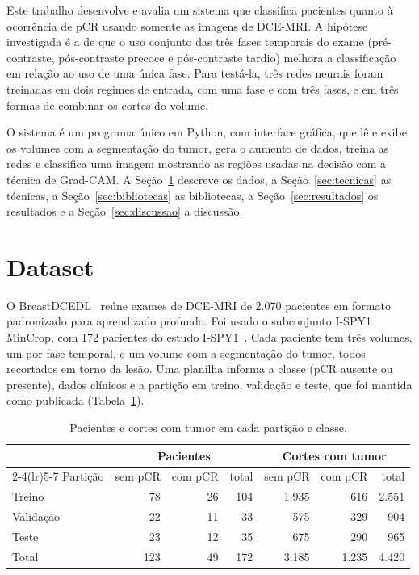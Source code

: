 \documentclass[12pt]{article}
\begin{document}
Este trabalho desenvolve e avalia um sistema que classifica pacientes quanto à ocorrência de pCR usando
somente as imagens de DCE-MRI. A hipótese investigada é a de que o uso conjunto das três fases temporais
do exame (pré-contraste, pós-contraste precoce e pós-contraste tardio) melhora a classificação em relação
ao uso de uma única fase. Para testá-la, três redes neurais foram treinadas em dois regimes de entrada,
com uma fase e com três fases, e em três formas de combinar os cortes do volume.

O sistema é um programa único em Python, com interface gráfica, que lê e exibe os volumes com a
segmentação do tumor, gera o aumento de dados, treina as redes e classifica uma imagem mostrando as
regiões usadas na decisão com a técnica de Grad-CAM. A Seção~\ref{sec:dataset} descreve os dados, a
Seção~\ref{sec:tecnicas} as técnicas, a Seção~\ref{sec:bibliotecas} as bibliotecas, a
Seção~\ref{sec:resultados} os resultados e a Seção~\ref{sec:discussao} a discussão.

\section{Dataset}
\label{sec:dataset}

O BreastDCEDL~\cite{fridman2026} reúne exames de DCE-MRI de 2.070 pacientes em formato padronizado para
aprendizado profundo. Foi usado o subconjunto I-SPY1 MinCrop, com 172 pacientes do estudo
I-SPY1~\cite{hylton2012}. Cada paciente tem três volumes, um por fase temporal, e um volume com a
segmentação do tumor, todos recortados em torno da lesão. Uma planilha informa a classe (pCR ausente ou
presente), dados clínicos e a partição em treino, validação e teste, que foi mantida como publicada
(Tabela~\ref{tab:particao}).

\begin{table}[ht]
\centering
\caption{Pacientes e cortes com tumor em cada partição e classe.}
\label{tab:particao}
\small
\begin{tabular}{lrrrrrr}
\toprule
 & \multicolumn{3}{c}{Pacientes} & \multicolumn{3}{c}{Cortes com tumor} \\
\cmidrule(lr){2-4}\cmidrule(lr){5-7}
Partição & sem pCR & com pCR & total & sem pCR & com pCR & total \\
\midrule
Treino    & 78  & 26 & 104 & 1.935 & 616   & 2.551 \\
Validação & 22  & 11 & 33  & 575   & 329   & 904 \\
Teste     & 23  & 12 & 35  & 675   & 290   & 965 \\
\midrule
Total     & 123 & 49 & 172 & 3.185 & 1.235 & 4.420 \\
\bottomrule
\end{tabular}
\end{table}
\end{document}
